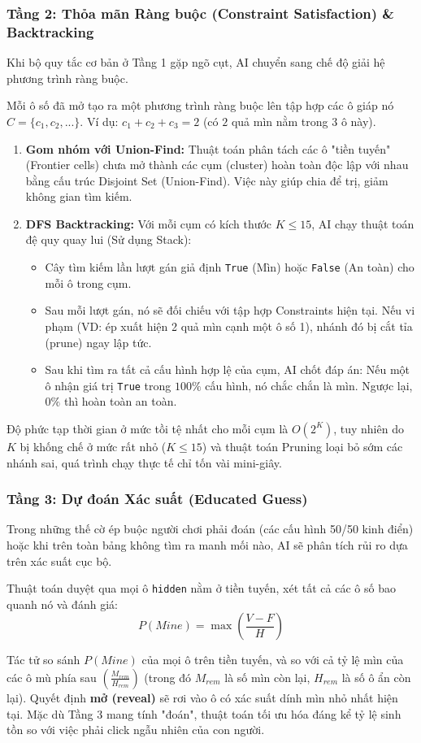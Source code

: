 \subsubsection{Tầng 2: Thỏa mãn Ràng buộc (Constraint Satisfaction) \& Backtracking}
Khi bộ quy tắc cơ bản ở Tầng 1 gặp ngõ cụt, AI chuyển sang chế độ giải hệ phương trình ràng buộc.

Mỗi ô số đã mở tạo ra một phương trình ràng buộc lên tập hợp các ô giáp nó $C = \{c_1, c_2, ...\}$. 
Ví dụ: $c_1 + c_2 + c_3 = 2$ (có $2$ quả mìn nằm trong $3$ ô này).

\begin{enumerate}
    \item \textbf{Gom nhóm với Union-Find:} Thuật toán phân tách các ô "tiền tuyến" (Frontier cells) chưa mở thành các cụm (cluster) hoàn toàn độc lập với nhau bằng cấu trúc Disjoint Set (Union-Find). Việc này giúp chia để trị, giảm không gian tìm kiếm.
    \item \textbf{DFS Backtracking:} Với mỗi cụm có kích thước $K \le 15$, AI chạy thuật toán đệ quy quay lui (Sử dụng Stack):
    \begin{itemize}
        \item Cây tìm kiếm lần lượt gán giả định \texttt{True} (Mìn) hoặc \texttt{False} (An toàn) cho mỗi ô trong cụm.
        \item Sau mỗi lượt gán, nó sẽ đối chiếu với tập hợp Constraints hiện tại. Nếu vi phạm (VD: ép xuất hiện 2 quả mìn cạnh một ô số 1), nhánh đó bị cắt tỉa (prune) ngay lập tức.
        \item Sau khi tìm ra tất cả cấu hình hợp lệ của cụm, AI chốt đáp án: Nếu một ô nhận giá trị \texttt{True} trong $100\%$ cấu hình, nó chắc chắn là mìn. Ngược lại, $0\%$ thì hoàn toàn an toàn.
    \end{itemize}
\end{enumerate}
Độ phức tạp thời gian ở mức tồi tệ nhất cho mỗi cụm là $O(2^K)$, tuy nhiên do $K$ bị khống chế ở mức rất nhỏ ($K \le 15$) và thuật toán Pruning loại bỏ sớm các nhánh sai, quá trình chạy thực tế chỉ tốn vài mini-giây.

\subsubsection{Tầng 3: Dự đoán Xác suất (Educated Guess)}
Trong những thế cờ ép buộc người chơi phải đoán (các cấu hình 50/50 kinh điển) hoặc khi trên toàn bảng không tìm ra manh mối nào, AI sẽ phân tích rủi ro dựa trên xác suất cục bộ.

Thuật toán duyệt qua mọi ô \texttt{hidden} nằm ở tiền tuyến, xét tất cả các ô số bao quanh nó và đánh giá:
\[ P(Mine) = \max \left( \frac{V - F}{H} \right) \]

Tác tử so sánh $P(Mine)$ của mọi ô trên tiền tuyến, và so với cả tỷ lệ mìn của các ô mù phía sau $\left(\frac{M_{rem}}{H_{rem}}\right)$ (trong đó $M_{rem}$ là số mìn còn lại, $H_{rem}$ là số ô ẩn còn lại). Quyết định \textbf{mở (reveal)} sẽ rơi vào ô có xác suất dính mìn nhỏ nhất hiện tại. Mặc dù Tầng 3 mang tính "đoán", thuật toán tối ưu hóa đáng kể tỷ lệ sinh tồn so với việc phải click ngẫu nhiên của con người.
